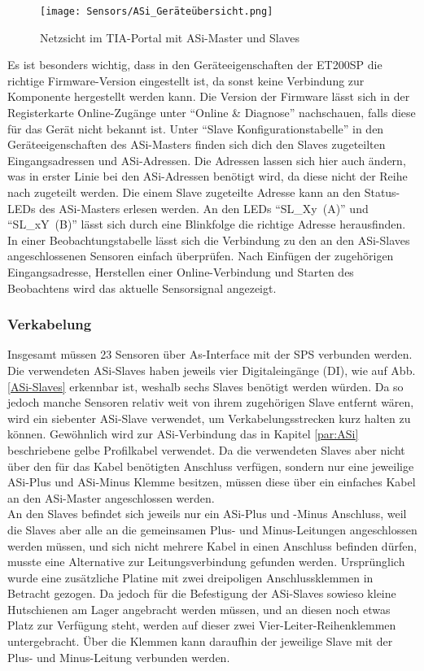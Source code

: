 \begin{figure}[H]
    \centering
    \texttt{[image: Sensors/ASi\_Geräteübersicht.png]}
    \caption{Netzsicht im TIA-Portal mit ASi-Master und Slaves}
    \label{ASi-Netzansicht}
\end{figure}

Es ist besonders wichtig, dass in den Geräteeigenschaften der ET200SP die richtige Firmware-Version eingestellt ist, da sonst keine Verbindung zur Komponente hergestellt werden kann. Die Version der Firmware lässt sich in der Registerkarte Online-Zugänge unter \enquote{Online \& Diagnose} nachschauen, falls diese für das Gerät nicht bekannt ist. Unter \enquote{Slave Konfigurationstabelle} in den Geräteeigenschaften des ASi-Masters finden sich dich den Slaves zugeteilten Eingangsadressen und ASi-Adressen. Die Adressen lassen sich hier auch ändern, was in erster Linie bei den ASi-Adressen benötigt wird, da diese nicht der Reihe nach zugeteilt werden. Die einem Slave zugeteilte Adresse kann an den Status-LEDs des ASi-Masters erlesen werden. An den LEDs \enquote{\mbox{SL\_Xy (A)}} und \enquote{\mbox{SL\_xY (B)}} lässt sich durch eine Blinkfolge die richtige Adresse herausfinden.\cite{ASi-Master_Handbuch}\\
In einer Beobachtungstabelle lässt sich die Verbindung zu den an den ASi-Slaves angeschlossenen Sensoren einfach überprüfen. Nach Einfügen der zugehörigen Eingangsadresse, Herstellen einer Online-Verbindung und Starten des Beobachtens wird das aktuelle Sensorsignal angezeigt.

\subsubsection{Verkabelung}
Insgesamt müssen 23 Sensoren über As-Interface mit der SPS verbunden werden. Die verwendeten ASi-Slaves haben jeweils vier Digitaleingänge (DI), wie auf Abb. \ref{ASi-Slaves} erkennbar ist, weshalb sechs Slaves benötigt werden würden. Da so jedoch manche Sensoren relativ weit von ihrem zugehörigen Slave entfernt wären, wird ein siebenter ASi-Slave verwendet, um Verkabelungsstrecken kurz halten zu können. Gewöhnlich wird zur ASi-Verbindung das in Kapitel \ref{par:ASi} beschriebene gelbe Profilkabel verwendet. Da die verwendeten Slaves aber nicht über den für das Kabel benötigten Anschluss verfügen, sondern nur eine jeweilige ASi-Plus und ASi-Minus Klemme besitzen, müssen diese über ein einfaches Kabel an den ASi-Master angeschlossen werden.\\
An den Slaves befindet sich jeweils nur ein ASi-Plus und -Minus Anschluss, weil die Slaves aber alle an die gemeinsamen Plus- und Minus-Leitungen angeschlossen werden müssen, und sich nicht mehrere Kabel in einen Anschluss befinden dürfen, musste eine Alternative zur Leitungsverbindung gefunden werden. Ursprünglich wurde eine zusätzliche Platine mit zwei dreipoligen Anschlussklemmen in Betracht gezogen. Da jedoch für die Befestigung der ASi-Slaves sowieso kleine Hutschienen am Lager angebracht werden müssen, und an diesen noch etwas Platz zur Verfügung steht, werden auf dieser zwei Vier-Leiter-Reihenklemmen untergebracht. Über die Klemmen kann daraufhin der jeweilige Slave mit der Plus- und Minus-Leitung verbunden werden.

